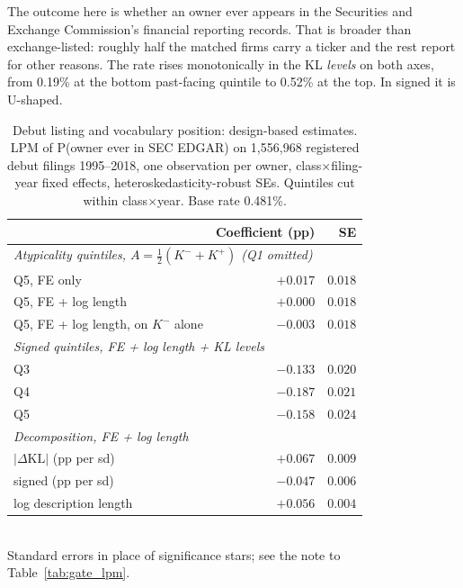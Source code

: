 The outcome here is whether an owner ever appears in the Securities and
Exchange Commission's financial reporting records. That is broader than
exchange-listed: roughly half the matched firms carry a ticker and the rest
report for other reasons. The rate rises monotonically in
the KL \emph{levels} on both axes, from 0.19\% at the bottom past-facing
quintile to 0.52\% at the top. In signed \dkl{} it is U-shaped.

\begin{table}[h]\centering\small
\caption{Debut listing and vocabulary position: design-based estimates.
LPM of P(owner ever in SEC EDGAR) on 1{,}556{,}968 registered debut
filings 1995--2018, one observation per owner, class$\times$filing-year
fixed effects, heteroskedasticity-robust SEs. Quintiles cut within
class$\times$year. Base rate 0.481\%.}
\label{tab:edgar}
\begin{tabular}{lrr}
\toprule
 & Coefficient (pp) & SE \\
\midrule
\multicolumn{3}{l}{\emph{Atypicality quintiles, $A = \tfrac{1}{2}(K^{-}+K^{+})$ (Q1 omitted)}} \\
\quad Q5, FE only & $+0.017$ & $0.018$ \\
\quad Q5, FE + log length & $+0.000$ & $0.018$ \\
\quad Q5, FE + log length, on $K^{-}$ alone & $-0.003$ & $0.018$ \\
\midrule
\multicolumn{3}{l}{\emph{Signed \dkl{} quintiles, FE + log length + KL levels}} \\
\quad Q3 & $-0.133$ & $0.020$ \\
\quad Q4 & $-0.187$ & $0.021$ \\
\quad Q5 & $-0.158$ & $0.024$ \\
\midrule
\multicolumn{3}{l}{\emph{Decomposition, FE + log length}} \\
\quad $|\Delta\mathrm{KL}|$ (pp per sd) & $+0.067$ & $0.009$ \\
\quad signed \dkl{} (pp per sd) & $-0.047$ & $0.006$ \\
\quad log description length & $+0.056$ & $0.004$ \\
\bottomrule
\end{tabular}
\\[0.3em]\footnotesize Standard errors in place of significance stars; see the
note to Table~\ref{tab:gate_lpm}.
\end{table}

